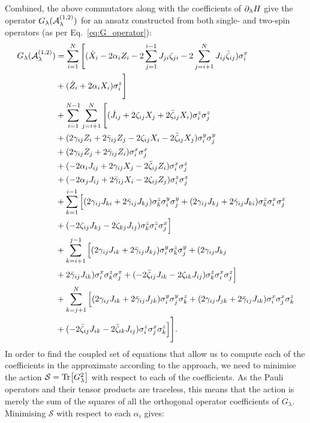 Combined, the above commutators along with the coefficients of $\partial_{\lambda} H$ give the operator $G_{\lambda}(\mathcal{A}_{\lambda}^{(1,2)})$ for an ansatz  constructed from both single- and two-spin operators (as per Eq.~\eqref{eq:G_operator}):
\begin{equation}\label{eq:ising_graph_G_operator}
    \begin{aligned}
        G_{\lambda}(\mathcal{A}_{\lambda}^{(1,2)}) &= \sum_{i=1}^N \Bigg[ (\dot{X}_i - 2\alpha_i Z_i - 2\sum_{j=1}^{i-1} J_{ji}\zeta_{ji} - 2\sum_{j=i+1}^N J_{ij}\Bar{\zeta}_{ij})\sigma^x_i \\
        &+ (\dot{Z}_i + 2\alpha_i X_i)\sigma^z_i \Bigg] \\
        &+ \sum_{i = 1}^{N-1} \sum_{j = i+1}^{N} \Bigg[(\dot{J}_{ij} + 2\zeta_{ij} X_j + 2\Bar{\zeta}_{ij} X_i)\sigma^z_i\sigma^z_j \\
        &+ (2\gamma_{ij}Z_i + 2\Bar{\gamma}_{ij} Z_j - 2 \zeta_{ij} X_i - 2 \Bar{\zeta}_{ij} X_j)\sigma^y_i\sigma^y_j \\
        &+ (2\gamma_{ij}Z_j + 2\Bar{\gamma}_{ij} Z_i)\sigma^x_i\sigma^x_j \\
        &+ (-2\alpha_i J_{ij} + 2\gamma_{ij}X_j - 2\Bar{\zeta}_{ij} Z_i)\sigma^x_i\sigma^z_j \\
        &+ (-2\alpha_j J_{ij} + 2\Bar{\gamma}_{ij}X_i - 2\zeta_{ij} Z_j)\sigma^z_i\sigma^x_j \\
        &+ \sum_{k = 1}^{i-1} \Big[ (2\gamma_{ij}J_{ki} + 2\Bar{\gamma}_{ij} J_{kj})\sigma^z_k\sigma^y_i\sigma^y_j + (2\gamma_{ij}J_{kj} + 2\Bar{\gamma}_{ij} J_{ki})\sigma^z_k\sigma^x_i\sigma^x_j \\
        &+ (- 2 \zeta_{ij} J_{kj} - 2 \zeta_{kj}J_{ij})\sigma^z_k\sigma^z_i\sigma^x_j \Big] \\
        &+ \sum_{k = i+1}^{j-1} \Big[ (2\gamma_{ij}J_{ik} + 2\Bar{\gamma}_{ij} J_{kj})\sigma^y_i\sigma^z_k\sigma^y_j + (2\gamma_{ij}J_{kj} \\
        &+ 2\Bar{\gamma}_{ij} J_{ik})\sigma^x_i\sigma^z_k\sigma^x_j + (- 2 \Bar{\zeta}_{ij} J_{ik} - 2 \zeta_{ik}J_{ij})\sigma^z_k\sigma^x_i\sigma^z_j \Big] \\
        &+ \sum_{k = j+1}^N \Big[ (2\gamma_{ij}J_{ik} + 2\Bar{\gamma}_{ij} J_{jk})\sigma^y_i\sigma^y_j\sigma^z_k + (2\gamma_{ij}J_{jk} + 2\Bar{\gamma}_{ij} J_{ik})\sigma^x_i\sigma^x_j\sigma^z_k \\
        &+ (- 2 \Bar{\zeta}_{ij} J_{ik} - 2 \Bar{\zeta}_{ik}J_{ij})\sigma^z_i\sigma^x_j\sigma^z_k \Big] \Bigg].
    \end{aligned}
\end{equation}
In order to find the coupled set of equations that allow us to compute each of the coefficients in the approximate  according to the  approach, we need to minimise the action $\mathcal{S} = \Tr[G_{\lambda}^2]$ with respect to each of the coefficients. As the Pauli operators and their tensor products are traceless, this means that the action is merely the sum of the squares of all the orthogonal operator coefficients of $G_{\lambda}$. Minimising $\mathcal{S}$ with respect to each $\alpha_i$ gives:
